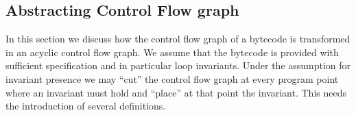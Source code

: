 
\subsection{Abstracting Control Flow graph}\label{abstrCntrFlow}
In this section we discuss how the control flow graph of a bytecode is transformed in an acyclic control flow graph. We assume that the bytecode is provided 
with sufficient specification and in particular loop invariants. Under the assumption for invariant presence we may ``cut'' the control flow graph at every program point
where an invariant must hold and ``place'' at that point the invariant. This needs the introduction of several definitions.

     
